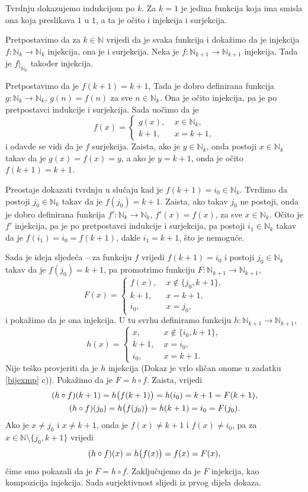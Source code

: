 \documentclass{book}
\let\originalleft\left
\let\originalright\right
\renewcommand{\left}{\mathopen{}\mathclose\bgroup\originalleft}
\renewcommand{\right}{\aftergroup\egroup\originalright}
\renewenvironment{proof}{%
    \vspace{-\parskip}\begin{oldproof}%
    }{%
    \end{oldproof}%
}
\theoremstyle{definition}
\theoremstyle{definition}
\theoremstyle{remark}
\begin{document}
\begin{proof}[Rješenje]
Tvrdnju dokazujemo indukcijom po $k$. Za $k=1$ je jedina funkcija koja ima smisla ona koja preslikava $1$ u $1$, a ta je očito i injekcija i surjekcija.

Pretpostavimo da za $k\in \mathbb{N}$ vrijedi da je svaka funkcija  i dokažimo da je injekcija $f : \mathbb{N}_k\to \mathbb{N}_k$ injekcija, ona je i surjekcija. Neka je $f : \mathbb{N}_{k+1}\to \mathbb{N}_{k+1}$ injekcija. Tada je $f|_{\mathbb{N}_k}$ također injekcija. 

Pretpostavimo da je $f(k+1)=k+1$, Tada je dobro definirana funkcija $g : \mathbb{N}_k\to \mathbb{N}_k$, $g(n)=f(n)$ za sve $n\in \mathbb{N}_k$. Ona je očito injekcija, pa je po pretpostavci indukcije i surjekcija. Sada uočimo da je
$$f(x)=\begin{cases}
g(x), &\;x\in \mathbb{N}_k,\\
k+1, &\; x=k+1,
\end{cases}$$
i odavde se vidi da je $f$ surjekcija. Zaista, ako je $y\in \mathbb {N}_k$, onda postoji $x\in \mathbb{N}_k$ takav da je $g(x)=f(x)=y$, a ako je $y=k+1$, onda je očito $f(k+1)=k+1$.

Preostaje dokazati tvrdnju u slučaju kad je $f(k+1)=i_0\in \mathbb{N}_k$. Tvrdimo da postoji $j_0\in \mathbb{N}_k$ takav da je $f(j_0)=k+1$. Zaista, ako takav $j_0$ ne postoji, onda je dobro definirana funkcija $f' : \mathbb{N}_k\to \mathbb{N}_k$, $f'(x)=f(x)$, za sve $x\in \mathbb{N}_k$. Očito je $f'$ injekcija, pa je po pretpostavci indukcije i surjekcija, pa postoji $i_1\in \mathbb{N}_k$ takav da je $f(i_1)=i_0=f(k+1)$, dakle $i_1=k+1$, što je nemoguće.

Sada je ideja sljedeća -- za funkciju $f$ vrijedi $f(k+1)=i_0$ i postoji $j_0\in \mathbb{N}_k$ takav da je $f(j_0)=k+1$, pa promotrimo funkciju $F : \mathbb{N}_{k+1}\to \mathbb{N}_{k+1}$,
$$F(x)=\begin{cases}
f(x), &\;x\notin\{j_0, k+1\},\\
k+1, &\; x=k+1,\\
i_0, &\; x=j_0,
\end{cases}$$
i pokažimo da je ona injekcija. U tu svrhu definiramo funkciju $h : \mathbb{N}_{k+1}\to \mathbb{N}_{k+1}$,
$$h(x)=\begin{cases}
x, &\;x\notin\{i_0, k+1\},\\
k+1, &\; x=i_0,\\
i_0, &\; x=k+1.
\end{cases}$$
Nije teško provjeriti da je $h$ injekcija (Dokaz je vrlo sličan onome u zadatku \ref{bijexmp} c)). Pokažimo da je $F=h\circ f$. Zaista, vrijedi 
\begin{gather*}
(h\circ f)(k+1)=h\left(f(k+1)\right)=h(i_0)=k+1=F(k+1),\\
(h\circ f)(j_0)=h\left(f(j_0)\right)=h(k+1)=i_0=F(j_0).
\end{gather*}
Ako je $x\neq j_0$ i $x\neq k+1$, onda je $f(x)\neq k+1$ i $f(x)\neq i_0$, pa za $x\in \mathbb{N}\setminus\{j_0, k+1\}$ vrijedi $$(h\circ f)(x)=h\left(f(x)\right)=f(x)=F(x),$$
čime smo pokazali da je $F=h\circ f$. Zaključujemo da je $F$ injekcija, kao kompozicija injekcija. Sada surjektivnost slijedi iz prvog dijela dokaza.
\end{proof}
\end{document}
